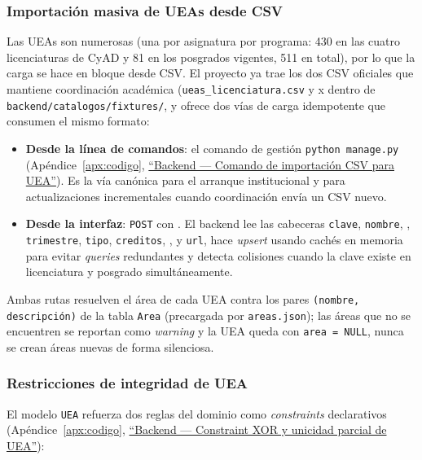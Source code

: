 \subsubsection{Importación masiva de UEAs desde CSV}

Las UEAs son numerosas (una por asignatura por programa: 430 en las cuatro licenciaturas de CyAD y 81 en los posgrados vigentes, 511 en total), por lo que la carga se hace en bloque desde CSV. El proyecto ya trae los dos CSV oficiales que mantiene coordinación académica (\texttt{ueas\_licenciatura.csv} y x dentro de \texttt{backend/catalogos/fixtures/}, y ofrece dos vías de carga idempotente que consumen el mismo formato:

\begin{itemize}
    \item \textbf{Desde la línea de comandos}: el comando de gestión \texttt{python manage.py } (Apéndice~\ref{apx:codigo}, \hyperref[lst:import_csv]{``Backend --- Comando de importación CSV para UEA''}). Es la vía canónica para el arranque institucional y para actualizaciones incrementales cuando coordinación envía un CSV nuevo.
    \item \textbf{Desde la interfaz}: \texttt{POST}  con . El backend lee las cabeceras \texttt{clave}, \texttt{nombre}, , \texttt{trimestre}, \texttt{tipo}, \texttt{creditos}, ,  y \texttt{url}, hace \emph{upsert} usando cachés en memoria para evitar \emph{queries} redundantes y detecta colisiones cuando la clave existe en licenciatura y posgrado simultáneamente.
\end{itemize}

Ambas rutas resuelven el área de cada UEA contra los pares \texttt{(nombre, descripción)} de la tabla \texttt{Area} (precargada por \texttt{areas.json}); las áreas que no se encuentren se reportan como \emph{warning} y la UEA queda con \texttt{area = NULL}, nunca se crean áreas nuevas de forma silenciosa.

\subsubsection{Restricciones de integridad de UEA}

El modelo \texttt{UEA} refuerza dos reglas del dominio como \emph{constraints} declarativos (Apéndice~\ref{apx:codigo}, \hyperref[lst:uea_constraints]{``Backend --- Constraint XOR y unicidad parcial de UEA''}):

